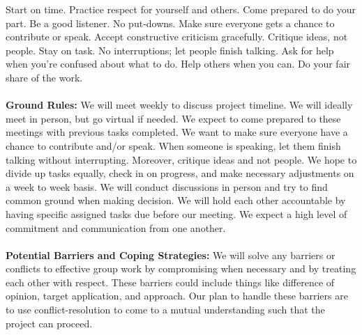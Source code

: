 \documentclass{vgtc}                          %
\begin{document}
Start on time.
Practice respect for yourself and others.
Come prepared to do your part.
Be a good listener.
No put-downs.
Make sure everyone gets a chance to contribute or speak.
Accept constructive criticism gracefully.
Critique ideas, not people.
Stay on task.
No interruptions; let people finish talking.
Ask for help when you’re confused about what to do.
Help others when you can.
Do your fair share of the work.
\\
\\
\noindent
\textbf{Ground Rules:} We will meet weekly to discuss project timeline. We will ideally meet in person, but go virtual if needed. We expect to come prepared to these meetings with previous tasks completed. We want to make sure everyone have a chance to contribute and/or speak. When someone is speaking, let them finish talking without interrupting. Moreover, critique ideas and not people. We hope to divide up tasks equally, check in on progress, and make necessary adjustments on a week to week basis. We will conduct discussions in person and try to find common ground when making decision. We will hold each other accountable by having specific assigned tasks due before our meeting. We expect a high level of commitment and communication from one another. 
\\
\\
\noindent
\textbf{Potential Barriers and Coping Strategies:}
We will solve any barriers or conflicts to effective group work by compromising when necessary and by treating each other with respect. These barriers could include things like difference of opinion, target application, and approach. Our plan to handle these barriers are to use conflict-resolution to come to a mutual understanding such that the project can proceed. 
\\
\\
\end{document}
